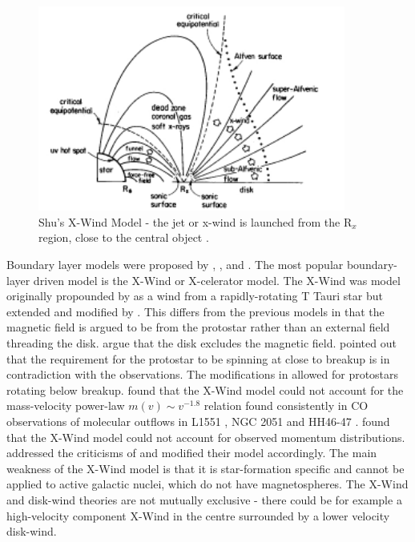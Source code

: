 \begin{figure}[t]
\centering
\includegraphics[width=0.9\textwidth]{shu94_3}
\caption{
Shu's X-Wind Model - the jet or x-wind is launched from the R$_x$ region, close to the central object \citep{1994ApJ...429..781S}.
}
\label{fig:XWind} %
\end{figure}
Boundary layer models were proposed by 
\citet{1988ApJ...328L..19S}, \citet{1989MNRAS.236..107P}, \citet{1990RvMA....3..234C} and \citet{1992ApJ...399L.163B}.
The most popular boundary-layer driven model is the X-Wind or X-celerator model.
The X-Wind was model originally propounded by \citet{1988ApJ...328L..19S} as a wind from a rapidly-rotating T Tauri star but extended and modified by \citet{1994ApJ...429..781S,1994ApJ...429..797S,1994ApJ...429..808N}. 
This differs from the previous models in that the magnetic field is argued to be from the protostar rather than an external field threading the disk.
\citet{1994ApJ...429..781S} argue that the disk excludes the magnetic field.
\citet{1989MNRAS.236..107P} pointed out that the requirement for the protostar to be spinning at close to breakup is in contradiction with the observations.
The modifications in \citet{1994ApJ...429..781S} allowed for protostars rotating below breakup.
\citet{1992ApJ...387L..47M,1993ApJ...414..230M} found that the X-Wind model could not account for the mass-velocity power-law $m(v) \sim v^{-1.8}$ relation found consistently in CO observations of molecular outflows in L1551 \citep{1988ApJ...332..364M}, NGC 2051 \citep{1988ApJ...332..364M}  and HH46-47 \citep{1991ApJ...382L..93C}.
\citet{1995ApJ...455..182C} found that the X-Wind model could not account for observed momentum distributions.
\citet{1996ApJ...468..261L} addressed the criticisms of \citet{1992ApJ...387L..47M} and modified their model accordingly.
The main weakness of the X-Wind model is that it is star-formation specific and cannot be applied to active galactic nuclei, which do not have magnetospheres. 
The X-Wind and disk-wind theories are not mutually exclusive - there could be for example a high-velocity component X-Wind in the centre surrounded by a lower velocity disk-wind.

